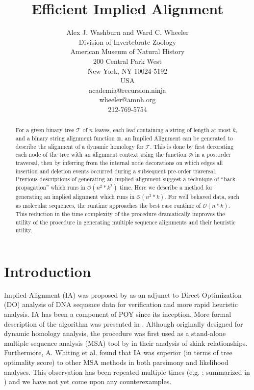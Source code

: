 \documentclass[11pt]{article}
\title{ \textbf{Efficient Implied Alignment}}
\author{Alex J. Washburn and Ward C. Wheeler\\
		Division of  Invertebrate Zoology\\
		American Museum of Natural History\\
		200 Central Park West\\
		New York, NY 10024-5192\\
		USA\\
		academia@recursion.ninja\\
		wheeler@amnh.org\\
		212-769-5754}
\begin{document}
\maketitle
\begin{abstract}
  For a given binary tree $\mathcal{T}$ of $n$ leaves, each leaf containing a string of length at most $k$, and a binary string alignment function $\otimes$, an Implied Alignment \citep{Wheeler2003} can be generated to describe the alignment of a dynamic homology for $\mathcal{T}$. This is done by first decorating each node of the tree with an alignment context using the function $\otimes$ in a postorder traversal, then by inferring from the internal node decorations on which edges all insertion and deletion events occurred during a subsequent pre-order traversal. Previous descriptions of generating an implied alignment suggest a technique of ``back-propagation'' which runs in $\mathcal{O}(n^2 * k^2)$ time. Here we describe a method for generating an implied alignment which runs in \textsc{$\mathcal{O}(n^2 * k)$}. For well behaved data, such as molecular sequences, the runtime approaches the best case runtime of \textsc{$\mathcal{O}(n * k)$}. This reduction in the time complexity of the procedure dramatically improves the utility of the procedure in generating multiple sequence alignments and their heuristic utility.
\end{abstract}
\newpage
\tableofcontents
\newpage

\section{Introduction}
Implied Alignment (IA) was proposed by \cite{Wheeler2003} as an adjunct to Direct Optimization (DO) \citep{Wheeler1996,VaronandWheeler2012} analysis of DNA sequence data for verification and more rapid heuristic analysis.
IA has been a component of POY \citep{Wheeleretal2015, POY5} since its inception.
More formal description of the algorithm was presented in \cite{Wheeleretal2006}.
Although originally designed for dynamic homology \citep{Wheeler2001} analysis, the procedure was first used as a stand-alone multiple sequence analysis (MSA) tool by \cite{WhitingAetal2006} in their analysis of skink relationships.  Furthermore, A. Whiting et al. found that IA was superior (in terms of tree optimality score) to other MSA methods in both parsimony and likelihood analyses.  
This observation has been repeated multiple times (e.g. \citealp{LindgrenandDaly2007, FordandWheeler2015}; summarized in \citealp{Wheeler2012}) and we have not yet come upon any counterexamples.    
\end{document}

